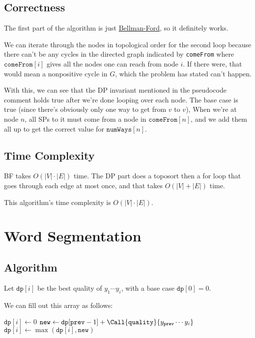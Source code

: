 \documentclass[12pt]{article}
\begin{document}
\subsection{Correctness}

The first part of the algorithm is just
\href{https://en.wikipedia.org/wiki/Bellman%E2%80%93Ford_algorithm#Algorithm}{Bellman-Ford},
so it definitely works.

We can iterate through the nodes in topological order
for the second loop because there can't be any cycles in the directed
graph indicated by \texttt{comeFrom} where $\texttt{comeFrom}[i]$
gives all the nodes one can reach from node $i$.
If there were, that would mean a nonpositive cycle in $G$,
which the problem has stated can't happen.

With this, we can see that the DP invariant mentioned in the pseudocode comment
holds true after we're done looping over each node.
The base case is true (since there's obviously only one way to get from $v$ to $v$),
When we're at node $n$, all SPs to it must come from a node in $\texttt{comeFrom}[n]$,
and we add them all up to get the correct value for $\texttt{numWays}[n]$.

\subsection{Time Complexity}

BF takes $O(|V| \cdot |E|)$ time.
The DP part does a toposort then a for loop that goes
through each edge at most once, and that takes $O(|V|+|E|)$ time.

This algorithm's time complexity is $\boxed{O(|V| \cdot |E|)}$.

\section{Word Segmentation}

\subsection{Algorithm}

Let $\texttt{dp}[i]$ be the best quality of $y_1 \cdots y_i$,
with a base case $\texttt{dp}[0]=0$.

We can fill out this array as follows:
\begin{algorithmic}
        \State $\texttt{dp}[i] \gets 0$
            \State $\texttt{new} \gets \texttt{dp}[\texttt{prev}-1]+\Call{\texttt{quality}}{y_\texttt{prev} \cdots y_i}$
            \State $\texttt{dp}[i] \gets \max(\texttt{dp}[i], \texttt{new})$
        \EndFor
    \EndFor
\end{algorithmic}
\end{document}
